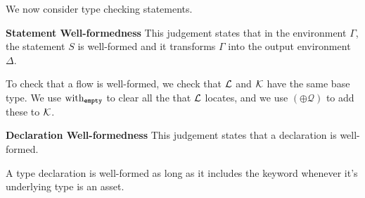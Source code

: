 \documentclass[nonacm, dvipsnames, sigconf]{acmart}
\begin{document}
We now consider type checking statements.

 \textbf{Statement Well-formedness}
This judgement states that in the environment $\Gamma$, the statement $S$ is well-formed and it transforms $\Gamma$ into the output environment $\Delta$.

To check that a flow is well-formed, we check that $\Loc$ and $\LocK$ have the same base type.
We use $\with_{\emptyq}$ to clear all the that $\Loc$ locates, and we use $(\oplus \mathcal{Q})$ to add these to $\LocK$.
\begin{mathpar}
\end{mathpar}


\framebox{$\flowproves \Decl~\ok$} \textbf{Declaration Well-formedness}
This judgement states that a declaration is well-formed.

A type declaration is well-formed as long as it includes the \asset keyword whenever it's underlying type is an asset.
\begin{mathpar}
\end{mathpar}
\end{document}

